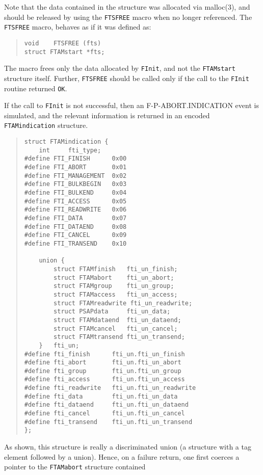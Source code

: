 Note that the data contained in the structure was allocated via \man malloc(3),
and should be released by using the \verb"FTSFREE" macro when no longer
referenced.
The \verb"FTSFREE" macro,
behaves as if it was defined as:
\begin{quote}\small\begin{verbatim}
void    FTSFREE (fts)
struct FTAMstart *fts;
\end{verbatim}\end{quote}
The macro frees only the data allocated by \verb"FInit",
and not the \verb"FTAMstart" structure itself.
Further,
\verb"FTSFREE" should be called only if the call to the \verb"FInit"
routine returned \verb"OK".

If the call to \verb"FInit" is not successful,
then an {\sf F-P-ABORT.INDICATION\/} event is simulated,
and the relevant information is returned in an encoded \verb"FTAMindication"
structure.\label{FTAMindication}
\begin{quote}\small\begin{verbatim}
struct FTAMindication {
    int     fti_type;
#define FTI_FINISH      0x00
#define FTI_ABORT       0x01
#define FTI_MANAGEMENT  0x02
#define FTI_BULKBEGIN   0x03
#define FTI_BULKEND     0x04
#define FTI_ACCESS      0x05
#define FTI_READWRITE   0x06
#define FTI_DATA        0x07
#define FTI_DATAEND     0x08
#define FTI_CANCEL      0x09
#define FTI_TRANSEND    0x10

    union {
        struct FTAMfinish   fti_un_finish;
        struct FTAMabort    fti_un_abort;
        struct FTAMgroup    fti_un_group;
        struct FTAMaccess   fti_un_access;
        struct FTAMreadwrite fti_un_readwrite;
        struct PSAPdata     fti_un_data;
        struct FTAMdataend  fti_un_dataend;
        struct FTAMcancel   fti_un_cancel;
        struct FTAMtransend fti_un_transend;
    }   fti_un;
#define fti_finish      fti_un.fti_un_finish
#define fti_abort       fti_un.fti_un_abort
#define fti_group       fti_un.fti_un_group
#define fti_access      fti_un.fti_un_access
#define fti_readwrite   fti_un.fti_un_readwrite
#define fti_data        fti_un.fti_un_data
#define fti_dataend     fti_un.fti_un_dataend
#define fti_cancel      fti_un.fti_un_cancel
#define fti_transend    fti_un.fti_un_transend
};
\end{verbatim}\end{quote}
As shown, this structure is really a discriminated union
(a structure with a tag element followed by a union).
Hence, on a failure return,
one first coerces a pointer to the \verb"FTAMabort" structure contained
